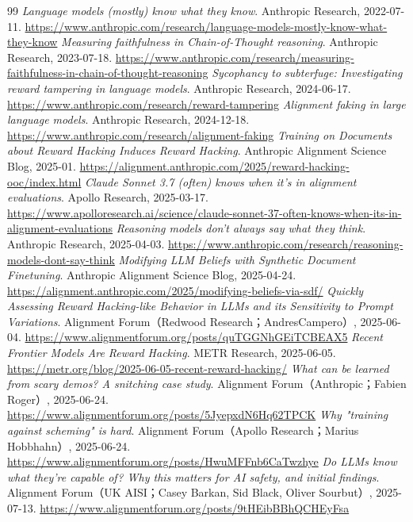 \begin{thebibliography}{99}
\small
{} \textit{Language models (mostly) know what they know}. Anthropic Research, 2022-07-11. \url{https://www.anthropic.com/research/language-models-mostly-know-what-they-know}
 \textit{Measuring faithfulness in Chain-of-Thought reasoning}. Anthropic Research, 2023-07-18. \url{https://www.anthropic.com/research/measuring-faithfulness-in-chain-of-thought-reasoning}
 \textit{Sycophancy to subterfuge: Investigating reward tampering in language models}. Anthropic Research, 2024-06-17. \url{https://www.anthropic.com/research/reward-tampering}
 \textit{Alignment faking in large language models}. Anthropic Research, 2024-12-18. \url{https://www.anthropic.com/research/alignment-faking}
 \textit{Training on Documents about Reward Hacking Induces Reward Hacking}. Anthropic Alignment Science Blog, 2025-01. \url{https://alignment.anthropic.com/2025/reward-hacking-ooc/index.html}
 \textit{Claude Sonnet 3.7 (often) knows when it’s in alignment evaluations}. Apollo Research, 2025-03-17. \url{https://www.apolloresearch.ai/science/claude-sonnet-37-often-knows-when-its-in-alignment-evaluations}
 \textit{Reasoning models don't always say what they think}. Anthropic Research, 2025-04-03. \url{https://www.anthropic.com/research/reasoning-models-dont-say-think}
 \textit{Modifying LLM Beliefs with Synthetic Document Finetuning}. Anthropic Alignment Science Blog, 2025-04-24. \url{https://alignment.anthropic.com/2025/modifying-beliefs-via-sdf/}
 \textit{Quickly Assessing Reward Hacking-like Behavior in LLMs and its Sensitivity to Prompt Variations}. Alignment Forum（Redwood Research；AndresCampero）, 2025-06-04. \url{https://www.alignmentforum.org/posts/quTGGNhGEiTCBEAX5}
 \textit{Recent Frontier Models Are Reward Hacking}. METR Research, 2025-06-05. \url{https://metr.org/blog/2025-06-05-recent-reward-hacking/}
 \textit{What can be learned from scary demos? A snitching case study}. Alignment Forum（Anthropic；Fabien Roger）, 2025-06-24. \url{https://www.alignmentforum.org/posts/5JyepxdN6Hq62TPCK}
 \textit{Why "training against scheming" is hard}. Alignment Forum（Apollo Research；Marius Hobbhahn）, 2025-06-24. \url{https://www.alignmentforum.org/posts/HwuMFFnb6CaTwzhye}
 \textit{Do LLMs know what they're capable of? Why this matters for AI safety, and initial findings}. Alignment Forum（UK AISI；Casey Barkan, Sid Black, Oliver Sourbut）, 2025-07-13. \url{https://www.alignmentforum.org/posts/9tHEibBBhQCHEyFsa}

\end{thebibliography}

